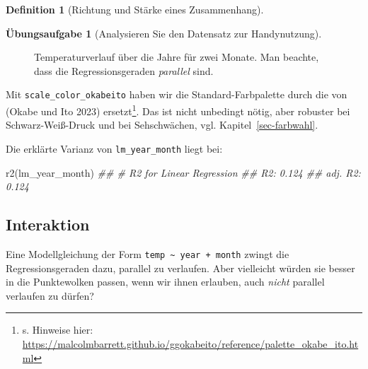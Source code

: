 \documentclass[
  a4paper,
  DIV=11]{scrreprt}
\newenvironment{Shaded}{\begin{snugshade}}{\end{snugshade}}
\newcommand{\DocumentationTok}[1]{\textcolor[rgb]{0.37,0.37,0.37}{\textit{#1}}}
\newcommand{\FunctionTok}[1]{\textcolor[rgb]{0.28,0.35,0.67}{#1}}
\newcommand{\NormalTok}[1]{\textcolor[rgb]{0.00,0.23,0.31}{#1}}
\theoremstyle{definition}
\newtheorem{exercise}{Übungsaufgabe}[chapter]
\theoremstyle{definition}
\theoremstyle{definition}
\newtheorem{definition}{Definition}[chapter]
\theoremstyle{remark}
\begin{document}
\begin{definition}[Richtung und Stärke eines
Zusammenhang]
\begin{exercise}[Analysieren Sie den Datensatz zur
Handynutzung]
\begin{figure}


\caption{\label{fig-lm3}Temperaturverlauf über die Jahre für zwei
Monate. Man beachte, dass die Regressionsgeraden \emph{parallel} sind.}

\end{figure}%

Mit \texttt{scale\_color\_okabeito} haben wir die Standard-Farbpalette
durch die von (Okabe und Ito 2023) ersetzt\footnote{s. Hinweise hier:
  \url{https://malcolmbarrett.github.io/ggokabeito/reference/palette_okabe_ito.html}}.
Das ist nicht unbedingt nötig, aber robuster bei Schwarz-Weiß-Druck und
bei Sehschwächen, vgl. Kapitel~\ref{sec-farbwahl}.

Die erklärte Varianz von \texttt{lm\_year\_month} liegt bei:

\begin{Shaded}
\begin{Highlighting}[]
\FunctionTok{r2}\NormalTok{(lm\_year\_month)}
\DocumentationTok{\#\# \# R2 for Linear Regression}
\DocumentationTok{\#\#        R2: 0.124}
\DocumentationTok{\#\#   adj. R2: 0.124}
\end{Highlighting}
\end{Shaded}

\subsection{Interaktion}\label{interaktion}

Eine Modellgleichung der Form
\texttt{temp\ \textasciitilde{}\ year\ +\ month} zwingt die
Regressionsgeraden dazu, parallel zu verlaufen. Aber vielleicht würden
sie besser in die Punktewolken passen, wenn wir ihnen erlauben, auch
\emph{nicht} parallel verlaufen zu dürfen?


\end{exercise}
\end{definition}
\end{document}
